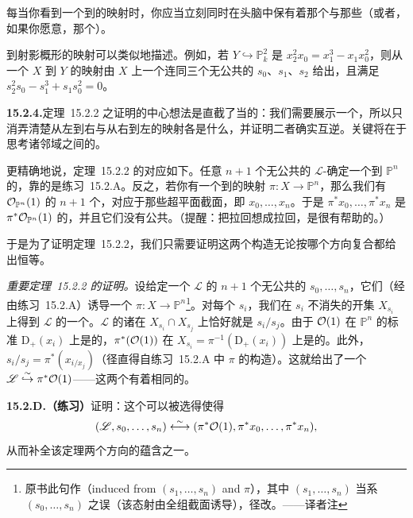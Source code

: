 每当你看到一个到\trProjectiveSpace{}的映射时，你应当立刻同时在头脑中保有着那个\trInvertibleSheaf{}与那些\trSection{}（或者，如果你愿意，那个\trLinearSystem）。

到射影概形的映射可以类似地描述。例如，若 $Y\hookrightarrow\mathbb{P}^2_k$ 是\trCurve{} $x_2^2x_0=x_1^3-x_1x_0^2$，则从一个\trScheme{} $X$ 到 $Y$ 的映射由 $X$ 上一个\trInvertibleSheaf{}连同三个无公共\trZeros{}的\trSection{} $s_0$、$s_1$、$s_2$ 给出，且满足 $s_2^2s_0-s_1^3+s_1s_0^2=0$。

\textbf{15.2.4.}\quad \mbox{定理~15.2.2} 之证明的中心想法是直截了当的：我们需要展示一个\trBijection，所以只消弄清楚从左到右与从右到左的映射各是什么，并证明二者确实互逆。关键将在于思考诸\trTrivialization{}邻域之间的\trTransitionFunction。

更精确地说，\mbox{定理~15.2.2} 的对应如下。任意 $n+1$ 个无公共\trZeros{}的 $\mathscr{L}$-\trSection{}确定一个到 $\mathbb{P}^n$ 的\trMorphism{}，靠的是\mbox{练习~15.2.A}。反之，若你有一个到\trProjectiveSpace{}的映射 $\pi\colon X\to\mathbb{P}^n$，那么我们有 $\mathcal{O}_{\mathbb{P}^n}(1)$ 的 $n+1$ 个\trSection，对应于那些超平面截面，即 $x_0,\dots,x_n$。于是 $\pi^*x_0,\dots,\pi^*x_n$ 是 $\pi^*\mathcal{O}_{\mathbb{P}^n}(1)$ 的\trSection，并且它们没有公共\trZeros{}。（提醒：把拉回\trInvertibleSheaf{}想成拉回\trTransitionFunction，是很有帮助的。）

于是为了证明\mbox{定理~15.2.2}，我们只需要证明这两个构造无论按哪个方向复合都给出恒等。

\emph{重要定理~15.2.2 的证明。}\quad 设给定一个\trInvertibleSheaf{} $\mathscr{L}$ 的 $n+1$ 个无公共\trZeros{}的\trSection{} $s_0,\dots,s_n$，它们（经由\mbox{练习~15.2.A}）诱导一个\trMorphism{} $\pi\colon X\to\mathbb{P}^n$\footnote{原书此句作（induced from $(s_1,\dots,s_n)$ and $\pi$），其中 $(s_1,\dots,s_n)$ 当系 $(s_0,\dots,s_n)$ 之误（该态射由全组截面诱导），径改。——译者注}。对每个 $s_i$，我们在 $s_i$ 不消失的开集 $X_{s_i}$ 上得到 $\mathscr{L}$ 的一个\trTrivialization。$\mathscr{L}$ 的诸\trTransitionFunction{}在 $X_{s_i}\cap X_{s_j}$ 上恰好就是 $s_i/s_j$。由于 $\mathcal{O}(1)$ 在 $\mathbb{P}^n$ 的标准\trAffine\trOpenSet{} $\mathrm{D}_+(x_i)$ 上是\trTrivial{}的，$\pi^*(\mathcal{O}(1))$ 在 $X_{s_i}=\pi^{-1}(\mathrm{D}_+(x_i))$ 上是\trTrivial{}的。此外，$s_i/s_j=\pi^*(x_{i/x_j})$（径直得自\mbox{练习~15.2.A} 中 $\pi$ 的构造）。这就给出了一个\trIsomorphism{} $\mathscr{L}\overset{\sim}{\hookrightarrow}\pi^*\mathcal{O}(1)$——这两个\trInvertibleSheaf{}有着相同的\trTransitionFunction。

\textbf{15.2.D.（练习）}\quad 证明：这个\trIsomorphism{}可以被选得使得
\[
(\mathscr{L},s_0,\dots,s_n)\overset{\sim}{\longleftrightarrow}(\pi^*\mathcal{O}(1),\pi^*x_0,\dots,\pi^*x_n),
\]
从而补全该定理两个方向的蕴含之一。

